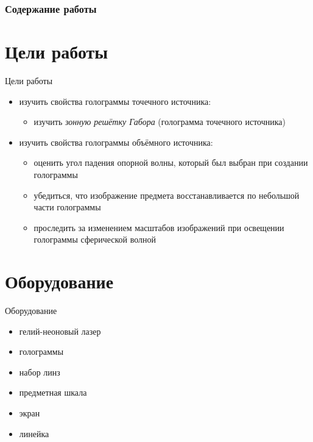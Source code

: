 \documentclass[11pt]{beamer} %
\begin{document}
\frame{\titlepage}

\begin{frame}
    \frametitle{Содержание работы}
    \tableofcontents
\end{frame}

\section{Цели работы}
    \begin{frame}{Цели работы}
        \begin{itemize}
            \item изучить свойства голограммы точечного источника:
            \begin{itemize}
                \item изучить \textit{зонную решётку Габора} (голограмма точечного источника)
            \end{itemize}

            \item изучить свойства голограммы объёмного источника:
            \begin{itemize}
                \item оценить угол падения опорной волны, который был выбран при создании голограммы
                \item убедиться, что изображение предмета восстанавливается по небольшой части голограммы
                \item проследить за изменением масштабов изображений при освещении голограммы сферической волной
            \end{itemize}
        \end{itemize}
    \end{frame}

    \section{Оборудование}
    \begin{frame}{Оборудование}
        \begin{itemize}
            \item гелий-неоновый лазер
            \item голограммы
            \item набор линз
            \item предметная шкала
            \item экран
            \item линейка
        \end{itemize}
    \end{frame}
\end{document}
